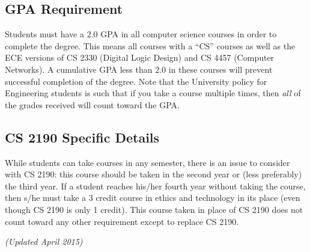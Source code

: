 

\subsection{GPA Requirement}

Students must have a 2.0 GPA in all computer science courses in order to complete the degree.  This means all courses with a ``CS'' courses as well as the ECE versions of CS 2330 (Digital Logic Design) and CS 4457 (Computer Networks).  A cumulative GPA less than 2.0 in these courses will prevent successful completion of the degree.  Note that the University policy for Engineering students is such that if you take a course multiple times, then {\em all} of the grades received will count toward the GPA.

\subsection{CS 2190 Specific Details}

While students can take courses in any semester, there is an issue to
consider with CS 2190: this course should be taken in the second year
or (less preferably) the third year. If a student reaches his/her
fourth year without taking the course, then s/he must take a 3 credit
course in ethics and technology in its place (even though CS 2190 is
only 1 credit). This course taken in place of CS 2190 does not count
toward any other requirement except to replace CS 2190.

\clearpage%
\begin{figure*}[h!]
{\em (Updated April 2015)}
\begin{center}
\end{center}
\end{figure*}
